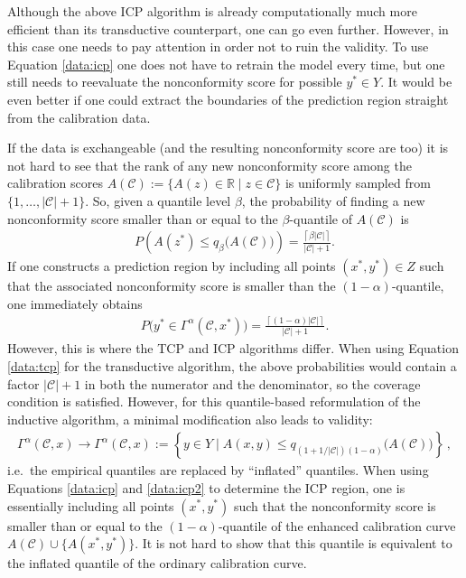     \begin{property}[Validity]
        Although the above ICP algorithm is already computationally much more efficient than its transductive counterpart, one can go even further. However, in this case one needs to pay attention in order not to ruin the validity. To use Equation \eqref{data:icp} one does not have to retrain the model every time, but one still needs to reevaluate the nonconformity score for possible $y^*\in Y$. It would be even better if one could extract the boundaries of the prediction region straight from the calibration data.

        If the data is exchangeable (and the resulting nonconformity score are too) it is not hard to see that the rank of any new nonconformity score among the calibration scores $A(\mathcal{C}):=\{A(z)\in\mathbb{R}\mid z\in\mathcal{C}\}$ is uniformly sampled from $\{1,\ldots,|\mathcal{C}|+1\}$. So, given a quantile level $\beta$, the probability of finding a new nonconformity score smaller than or equal to the $\beta$-quantile of $A(\mathcal{C})$ is
        \begin{gather}
            P\left(A(z^*)\leq q_\beta\big(A(\mathcal{C})\big)\right) = \frac{\left\lceil\beta|\mathcal{C}|\right\rceil}{|\mathcal{C}|+1}.
        \end{gather}
        If one constructs a prediction region by including all points $(x^*,y^*)\in Z$ such that the associated nonconformity score is smaller than the $(1-\alpha)$-quantile, one immediately obtains
        \begin{gather}
            P\big(y^*\in\Gamma^\alpha(\mathcal{C},x^*)\big) = \frac{\left\lceil(1-\alpha)|\mathcal{C}|\right\rceil}{|\mathcal{C}|+1}.
        \end{gather}
        However, this is where the TCP and ICP algorithms differ. When using Equation \eqref{data:tcp} for the transductive algorithm, the above probabilities would contain a factor $|\mathcal{C}|+1$ in both the numerator and the denominator, so the coverage condition is satisfied. However, for this quantile-based reformulation of the inductive algorithm, a minimal modification also leads to validity:
        \begin{gather}
            \Gamma^\alpha(\mathcal{C},x)\longrightarrow\Gamma^\alpha(\mathcal{C},x) := \left\{y\in Y\mid A(x,y)\leq q_{(1+1/|\mathcal{C}|)(1-\alpha)}\big(A(\mathcal{C})\big)\right\}\,,
        \end{gather}
        i.e.~the empirical quantiles are replaced by ``inflated'' quantiles. When using Equations \eqref{data:icp} and \eqref{data:icp2} to determine the ICP region, one is essentially including all points $(x^*,y^*)$ such that the nonconformity score is smaller than or equal to the $(1-\alpha)$-quantile of the enhanced calibration curve $A(\mathcal{C})\cup\{A(x^*,y^*)\}$. It is not hard to show that this quantile is equivalent to the inflated quantile of the ordinary calibration curve.


\end{property}
